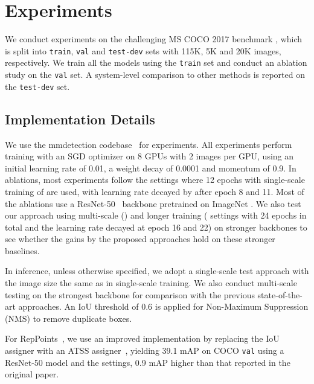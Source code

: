 \documentclass{article}
\begin{document}
\section{Experiments}

We conduct experiments on the challenging MS COCO 2017 benchmark \cite{lin14coco}, which is split into \texttt{train}, \texttt{val} and \texttt{test-dev} sets with 115K, 5K and 20K images, respectively. We train all the models using the \texttt{train} set and conduct an ablation study on the \texttt{val} set. A system-level comparison to other methods is reported on the \texttt{test-dev} set. 

\subsection{Implementation Details}

We use the mmdetection codebase~\cite{mmdetection} for experiments. All experiments perform training with an SGD optimizer on 8 GPUs with 2 images per GPU, using an initial learning rate of 0.01, a weight decay of 0.0001 and momentum of 0.9. In ablations, most experiments follow the  settings where 12 epochs with single-scale training of  are used, with learning rate decayed by  after epoch 8 and 11. Most of the ablations use a ResNet-50~\cite{he16res} backbone pretrained on ImageNet \cite{olga15imagenet}. We also test our approach using multi-scale () and longer training ( settings with 24 epochs in total and the learning rate decayed at epoch 16 and 22) on stronger backbones to see whether the gains by the proposed approaches hold on these stronger baselines.

In inference, unless otherwise specified, we adopt a single-scale test approach with the image size the same as in single-scale training. We also conduct multi-scale testing on the strongest backbone for comparison with the previous state-of-the-art approaches. An IoU threshold of 0.6 is applied for Non-Maximum Suppression (NMS) to remove duplicate boxes.

For RepPoints~\cite{yang19reppts}, we use an improved implementation by replacing the IoU assigner with an ATSS assigner~\cite{zhang2019atss}, yielding 39.1 mAP on COCO \texttt{val} using a ResNet-50 model and the  settings, 0.9 mAP higher than that reported in the original paper.
\end{document}
